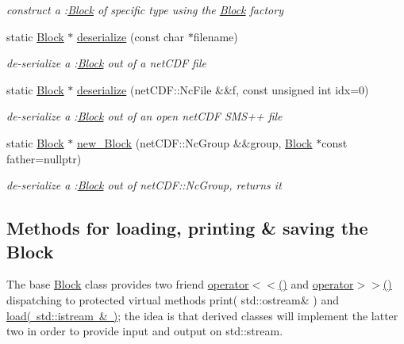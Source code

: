 \begin{DoxyCompactItemize}
\begin{DoxyCompactList}\small\item\em construct a \+:\mbox{\hyperlink{class_s_m_spp__di__unipi__it_1_1_block}{Block}} of specific type using the \mbox{\hyperlink{class_s_m_spp__di__unipi__it_1_1_block}{Block}} factory \end{DoxyCompactList}\item 
static \mbox{\hyperlink{class_s_m_spp__di__unipi__it_1_1_block}{Block}} $\ast$ \mbox{\hyperlink{class_s_m_spp__di__unipi__it_1_1_block_a4210de3b3b076cf4273eaee2b916da84}{deserialize}} (const char $\ast$filename)
\begin{DoxyCompactList}\small\item\em de-\/serialize a \+:\mbox{\hyperlink{class_s_m_spp__di__unipi__it_1_1_block}{Block}} out of a net\+C\+DF file \end{DoxyCompactList}\item 
static \mbox{\hyperlink{class_s_m_spp__di__unipi__it_1_1_block}{Block}} $\ast$ \mbox{\hyperlink{class_s_m_spp__di__unipi__it_1_1_block_afb0cada3cc11e452ec6da432cedc8906}{deserialize}} (net\+C\+D\+F\+::\+Nc\+File \&\&f, const unsigned int idx=0)
\begin{DoxyCompactList}\small\item\em de-\/serialize a \+:\mbox{\hyperlink{class_s_m_spp__di__unipi__it_1_1_block}{Block}} out of an open net\+C\+DF S\+M\+S++ file \end{DoxyCompactList}\item 
static \mbox{\hyperlink{class_s_m_spp__di__unipi__it_1_1_block}{Block}} $\ast$ \mbox{\hyperlink{class_s_m_spp__di__unipi__it_1_1_block_a47c09b44e75478c5f3e24323d2f6449f}{new\+\_\+\+Block}} (net\+C\+D\+F\+::\+Nc\+Group \&\&group, \mbox{\hyperlink{class_s_m_spp__di__unipi__it_1_1_block}{Block}} $\ast$const father=nullptr)
\begin{DoxyCompactList}\small\item\em de-\/serialize a \+:\mbox{\hyperlink{class_s_m_spp__di__unipi__it_1_1_block}{Block}} out of net\+C\+D\+F\+::\+Nc\+Group, returns it \end{DoxyCompactList}\end{DoxyCompactItemize}
\subsection*{Methods for loading, printing \& saving the Block}
\label{_amgrpeec46a84109e63c089d54b4ceec4fea5}%
The base \mbox{\hyperlink{class_s_m_spp__di__unipi__it_1_1_block}{Block}} class provides two friend \mbox{\hyperlink{class_s_m_spp__di__unipi__it_1_1_block_aaf14d09576853bb38438285dacb32655}{operator$<$$<$()}} and \mbox{\hyperlink{class_s_m_spp__di__unipi__it_1_1_block_a7124899e39ee61687c43c1061d3a0353}{operator$>$$>$()}} dispatching to protected virtual methods print( std\+::ostream\& ) and \mbox{\hyperlink{class_s_m_spp__di__unipi__it_1_1_block_a27ae9e4279482d52342c7958c34a43c6}{load( std\+::istream \& )}}; the idea is that derived classes will implement the latter two in order to provide input and output on std\+::stream.

